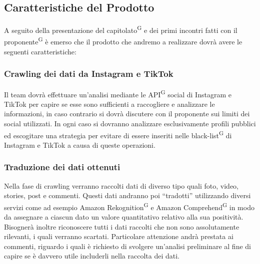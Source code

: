 
\subsection{Caratteristiche del Prodotto}

A seguito della presentazione del capitolato\textsuperscript{G} e dei primi incontri fatti con il proponente\textsuperscript{G} è emerso che il prodotto che andremo a realizzare dovrà avere le seguenti caratteristiche:

\subsubsection{Crawling dei dati da Instagram e TikTok}
Il team dovrà effettuare un’analisi mediante le API\textsuperscript{G} social di Instagram e TikTok per capire se esse sono sufficienti a raccogliere e analizzare le informazioni, in caso contrario si dovrà discutere con il proponente sui limiti dei social utilizzati. In ogni caso si dovranno analizzare esclusivamente profili pubblici ed escogitare una strategia per evitare di essere inseriti nelle black-list\textsuperscript{G} di Instagram e TikTok a causa di queste operazioni.

\subsubsection{Traduzione dei dati ottenuti}
Nella fase di crawling verranno raccolti dati di diverso tipo quali foto, video, stories, post e commenti. Questi dati andranno poi “tradotti” utilizzando diversi servizi come ad esempio Amazon Rekognition\textsuperscript{G} e Amazon Comprehend\textsuperscript{G} in modo da assegnare a ciascun dato un valore quantitativo relativo alla sua positività. Bisognerà inoltre riconoscere tutti i dati raccolti che non sono assolutamente rilevanti, i quali verranno scartati. Particolare attenzione andrà prestata ai commenti, riguardo i quali è richiesto di svolgere un’analisi preliminare al fine di capire se è davvero utile includerli nella raccolta dei dati.

